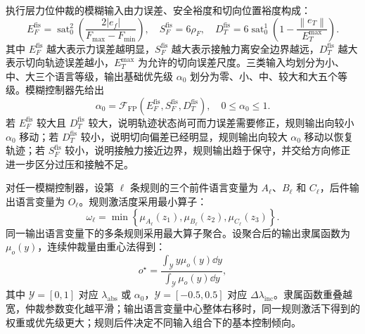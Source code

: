 执行层力位仲裁的模糊输入由力误差、安全裕度和切向位置裕度构成：
\begin{equation}
  E_F^{\mathrm{fis}}=
  \operatorname{sat}_{0}^{2}\left(\frac{2|e_f|}{F_{\max}-F_{\min}}\right),
  \quad
  S_F^{\mathrm{fis}}=6\rho_F,
  \quad
  D_T^{\mathrm{fis}}=
  6\operatorname{sat}_{0}^{1}
  \left(1-\frac{\left\|e_T\right\|}{E_T^{\max}}\right).
  \label{eq:ch5_fp_fis_inputs}
\end{equation}
其中 $E_F^{\mathrm{fis}}$ 越大表示力误差越明显，$S_F^{\mathrm{fis}}$ 越大表示接触力离安全边界越远，$D_T^{\mathrm{fis}}$ 越大表示切向轨迹误差越小，$E_T^{\max}$ 为允许的切向误差尺度。三类输入均划分为小、中、大三个语言等级，输出基础优先级 $\alpha_0$ 划分为零、小、中、较大和大五个等级。模糊控制器先给出
\begin{equation}
  \alpha_0=
  \mathcal F_{\mathrm{FP}}
  \left(E_F^{\mathrm{fis}},S_F^{\mathrm{fis}},D_T^{\mathrm{fis}}\right),
  \quad 0\le \alpha_0\le 1 .
  \label{eq:ch5_fp_base_priority}
\end{equation}
若 $E_F^{\mathrm{fis}}$ 较大且 $D_T^{\mathrm{fis}}$ 较大，说明轨迹状态尚可而力误差需要修正，规则输出向较小 $\alpha_0$ 移动；若 $D_T^{\mathrm{fis}}$ 较小，说明切向偏差已经明显，规则输出向较大 $\alpha_0$ 移动以恢复轨迹；若 $S_F^{\mathrm{fis}}$ 较小，说明接触力接近边界，规则输出趋于保守，并交给方向修正进一步区分过压和接触不足。

对任一模糊控制器，设第 $\ell$ 条规则的三个前件语言变量为 $A_{\ell}$、$B_{\ell}$ 和 $C_{\ell}$，后件输出语言变量为 $O_{\ell}$。规则激活度采用最小算子：
\begin{equation}
  \omega_{\ell}=
  \min\left\{
  \mu_{A_{\ell}}(z_1),
  \mu_{B_{\ell}}(z_2),
  \mu_{C_{\ell}}(z_3)
  \right\}.
  \label{eq:ch5_fuzzy_activation}
\end{equation}
同一输出语言变量下的多条规则采用最大算子聚合。设聚合后的输出隶属函数为 $\mu_o(y)$，连续仲裁量由重心法得到：
\begin{equation}
  o^\star=
  \frac{\int_{\mathcal Y}y\mu_o(y)\dd y}
       {\int_{\mathcal Y}\mu_o(y)\dd y},
  \label{eq:ch5_fuzzy_centroid}
\end{equation}
其中 $\mathcal Y=[0,1]$ 对应 $\lambda_{\mathrm{abs}}$ 或 $\alpha_0$，$\mathcal Y=[-0.5,0.5]$ 对应 $\Delta\lambda_{\mathrm{inc}}$。隶属函数重叠越宽，仲裁参数变化越平滑；输出语言变量中心整体右移时，同一规则激活下得到的权重或优先级更大；规则后件决定不同输入组合下的基本控制倾向。

